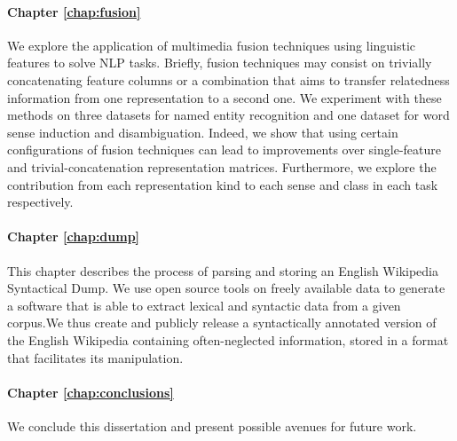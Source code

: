 \paragraph{Chapter \ref{chap:fusion}} We explore the application of multimedia fusion techniques using linguistic features to solve NLP tasks. Briefly, fusion techniques may consist on trivially concatenating feature columns or a combination that aims to transfer relatedness information from one representation to a second one. We experiment with these methods on three datasets for named entity recognition and one dataset for word sense induction and disambiguation. Indeed, we show that using certain configurations of fusion techniques can lead to improvements over single-feature and trivial-concatenation representation matrices. Furthermore, we explore the contribution from each representation kind to each sense and class in each task respectively.
\paragraph{Chapter \ref{chap:dump}} This chapter describes the process of parsing and storing an English Wikipedia Syntactical Dump. We use open source tools on freely available data to generate a software that is able to extract lexical and syntactic data from a given corpus.We thus create and publicly release a syntactically annotated version of the English Wikipedia containing often-neglected information, stored in a format that facilitates its manipulation. 

\paragraph{Chapter \ref{chap:conclusions}} We conclude this dissertation and present possible avenues for future work.


